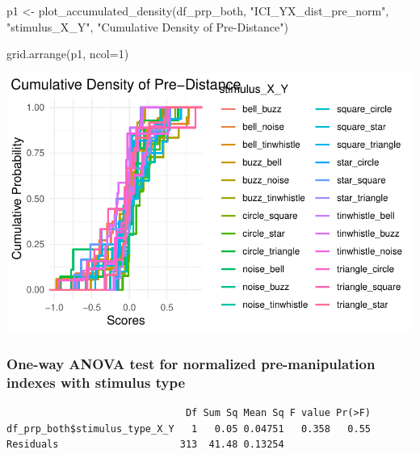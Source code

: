\documentclass[
  letterpaper,
  DIV=11,
  numbers=noendperiod]{scrartcl}
\newenvironment{Shaded}{\begin{snugshade}}{\end{snugshade}}
\newcommand{\AttributeTok}[1]{\textcolor[rgb]{0.40,0.45,0.13}{#1}}
\newcommand{\DecValTok}[1]{\textcolor[rgb]{0.68,0.00,0.00}{#1}}
\newcommand{\FunctionTok}[1]{\textcolor[rgb]{0.28,0.35,0.67}{#1}}
\newcommand{\NormalTok}[1]{\textcolor[rgb]{0.00,0.23,0.31}{#1}}
\newcommand{\OtherTok}[1]{\textcolor[rgb]{0.00,0.23,0.31}{#1}}
\newcommand{\SpecialCharTok}[1]{\textcolor[rgb]{0.37,0.37,0.37}{#1}}
\newcommand{\StringTok}[1]{\textcolor[rgb]{0.13,0.47,0.30}{#1}}
\begin{document}
\begin{Shaded}
\begin{Highlighting}[]
\NormalTok{p1 }\OtherTok{\textless{}{-}} \FunctionTok{plot\_accumulated\_density}\NormalTok{(df\_prp\_both, }\StringTok{"ICI\_YX\_dist\_pre\_norm"}\NormalTok{, }\StringTok{"stimulus\_X\_Y"}\NormalTok{, }\StringTok{"Cumulative Density of Pre{-}Distance"}\NormalTok{)}

\FunctionTok{grid.arrange}\NormalTok{(p1, }\AttributeTok{ncol=}\DecValTok{1}\NormalTok{)}
\end{Highlighting}
\end{Shaded}

\includegraphics{index_files/figure-pdf/unnamed-chunk-26-2.pdf}

\subsubsection{One-way ANOVA test for normalized pre-manipulation
indexes with stimulus
type}\label{one-way-anova-test-for-normalized-pre-manipulation-indexes-with-stimulus-type}

\begin{Shaded}
\end{Shaded}

\begin{verbatim}
                               Df Sum Sq Mean Sq F value Pr(>F)
df_prp_both$stimulus_type_X_Y   1   0.05 0.04751   0.358   0.55
Residuals                     313  41.48 0.13254               
\end{verbatim}
\end{document}
